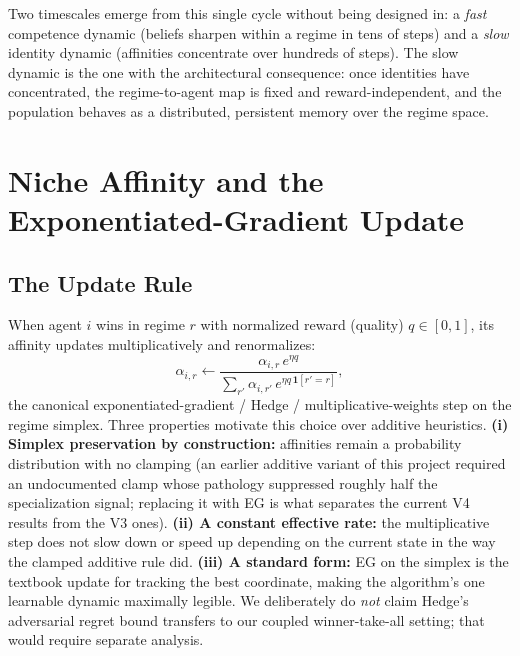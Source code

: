 \documentclass[11pt]{article}
\begin{document}
Two timescales emerge from this single cycle without being designed in: a
\emph{fast} competence dynamic (beliefs sharpen within a regime in tens of
steps) and a \emph{slow} identity dynamic (affinities concentrate over hundreds
of steps). The slow dynamic is the one with the architectural consequence: once
identities have concentrated, the regime-to-agent map is fixed and
reward-independent, and the population behaves as a distributed, persistent
memory over the regime space.

\section{Niche Affinity and the Exponentiated-Gradient Update}
\label{sec:affinity}

\subsection{The Update Rule}

When agent $i$ wins in regime $r$ with normalized reward (quality) $q \in [0,1]$,
its affinity updates multiplicatively and renormalizes:
\begin{equation}
    \alpha_{i,r} \leftarrow \frac{\alpha_{i,r}\, e^{\eta q}}
    {\sum_{r'} \alpha_{i,r'}\, e^{\eta q\,\mathbf{1}[r'=r]}},
\end{equation}
the canonical exponentiated-gradient / Hedge / multiplicative-weights step on
the regime simplex. Three properties motivate this choice over additive
heuristics. \textbf{(i) Simplex preservation by construction:} affinities remain
a probability distribution with no clamping (an earlier additive variant of this
project required an undocumented clamp whose pathology suppressed roughly half
the specialization signal; replacing it with EG is what separates the current
V4 results from the V3 ones). \textbf{(ii) A constant effective rate:} the
multiplicative step does not slow down or speed up depending on the current
state in the way the clamped additive rule did. \textbf{(iii) A standard form:}
EG on the simplex is the textbook update for tracking the best coordinate,
making the algorithm's one learnable dynamic maximally legible. We deliberately
do \emph{not} claim Hedge's adversarial regret bound transfers to our coupled
winner-take-all setting; that would require separate analysis.
\end{document}
